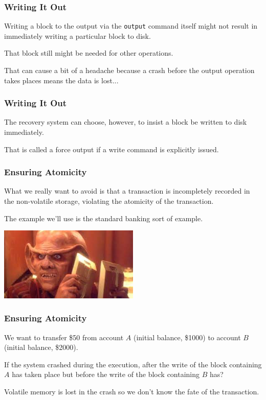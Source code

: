 \begin{frame}
\frametitle{Writing It Out}

Writing a block to the output via the \texttt{output} command itself might not result in immediately writing a particular block to disk. 

That block still might be needed for other operations. 

That can cause a bit of a headache because a crash before the output operation takes places means the data is lost... 

\end{frame}

\begin{frame}
\frametitle{Writing It Out}

The recovery system can choose, however, to insist a block be written to disk immediately. 

That is called a \alert{force output} if a write command is explicitly issued.

\end{frame}

\begin{frame}
\frametitle{Ensuring Atomicity}

What we really want to avoid is that a transaction is incompletely recorded in the non-volatile storage, violating the atomicity of the transaction. 

The example we'll use is the standard banking sort of example.

\begin{center}
	\includegraphics[width=0.5\textwidth]{images/latinum.jpg}
\end{center} 


\end{frame}

\begin{frame}
\frametitle{Ensuring Atomicity}


We want to transfer \$50 from account $A$ (initial balance, \$1000) to account $B$ (initial balance, \$2000). 

If the system crashed during the execution, after the write of the block containing $A$ has taken place but before the write of the block containing $B$ has? 

Volatile memory is lost in the crash so we don't know the fate of the transaction.

\end{frame}

